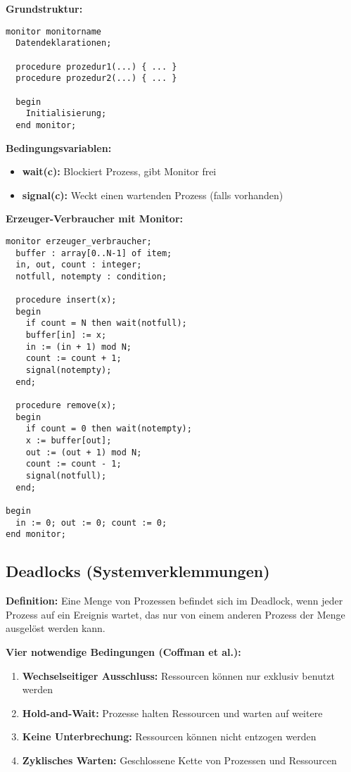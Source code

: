 \documentclass[9pt,a4paper]{extarticle}
\begin{document}
\begin{multicols*}{2}
\textbf{Grundstruktur:}
\begin{verbatim}
monitor monitorname
  Datendeklarationen;
  
  procedure prozedur1(...) { ... }
  procedure prozedur2(...) { ... }
  
  begin
    Initialisierung;
  end monitor;
\end{verbatim}

\textbf{Bedingungsvariablen:}
\begin{itemize}
\item \textbf{wait(c):} Blockiert Prozess, gibt Monitor frei
\item \textbf{signal(c):} Weckt einen wartenden Prozess (falls vorhanden)
\end{itemize}

\textbf{Erzeuger-Verbraucher mit Monitor:}
\begin{verbatim}
monitor erzeuger_verbraucher;
  buffer : array[0..N-1] of item;
  in, out, count : integer;
  notfull, notempty : condition;
  
  procedure insert(x);
  begin
    if count = N then wait(notfull);
    buffer[in] := x;
    in := (in + 1) mod N;
    count := count + 1;
    signal(notempty);
  end;
  
  procedure remove(x);
  begin
    if count = 0 then wait(notempty);
    x := buffer[out];
    out := (out + 1) mod N;
    count := count - 1;
    signal(notfull);
  end;
  
begin
  in := 0; out := 0; count := 0;
end monitor;
\end{verbatim}

\subsection{Deadlocks (Systemverklemmungen)}
\textbf{Definition:} Eine Menge von Prozessen befindet sich im Deadlock, wenn jeder Prozess auf ein Ereignis wartet, das nur von einem anderen Prozess der Menge ausgelöst werden kann.

\textbf{Vier notwendige Bedingungen (Coffman et al.):}
\begin{enumerate}
\item \textbf{Wechselseitiger Ausschluss:} Ressourcen können nur exklusiv benutzt werden
\item \textbf{Hold-and-Wait:} Prozesse halten Ressourcen und warten auf weitere
\item \textbf{Keine Unterbrechung:} Ressourcen können nicht entzogen werden
\item \textbf{Zyklisches Warten:} Geschlossene Kette von Prozessen und Ressourcen
\end{enumerate}


\end{multicols*}
\end{document}
